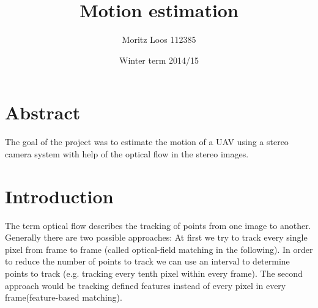 \documentclass[11pt]{article}
\title{\textbf{Motion estimation}}
\author{ Moritz Loos 112385 }
\date{ Winter term 2014/15 }
\begin{document}
	
	
	\maketitle

	\section{Abstract}
	The goal of the project was to estimate the motion of a UAV using a stereo camera system with help of the optical flow in the stereo images.

	\section{Introduction}
	The term optical flow describes the tracking of points from one image to another. Generally there are two possible approaches:
	At first we try to track every single pixel from frame to frame (called optical-field matching in the following). In order to reduce the number of points to track we can use an interval to determine points to track (e.g. tracking every tenth pixel within every frame). The second approach would be tracking defined features instead of every pixel in every frame(feature-based matching).
	
\end{document}
